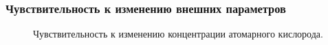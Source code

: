 \documentclass[9pt, apectratio=43,unicode]{beamer}
\begin{document}
\begin{frame}\frametitle{Чувствительность к изменению внешних параметров}
\begin{figure}
\caption{Чувствительность к изменению концентрации атомарного кислорода.}
\end{figure}
\end{frame}
\end{document}
